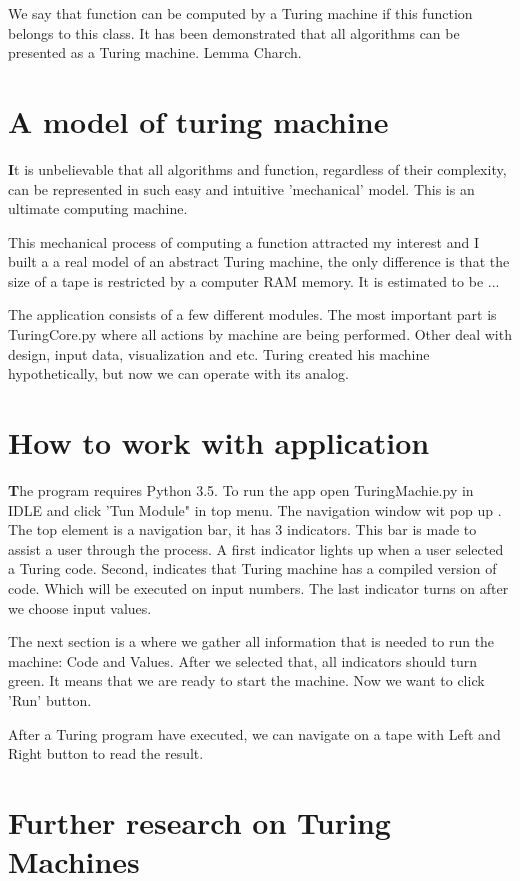\documentclass[12pt]{article}
\begin{document}
We say that function can be computed by a Turing machine if this function belongs to this class. It has been demonstrated that all algorithms can be presented as a Turing machine. Lemma Charch.

\section{A model of turing machine}
\textbf{\large I}t is unbelievable that all algorithms and function, regardless of their complexity, can be represented in such easy and intuitive 'mechanical' model. This is an ultimate computing machine.

This mechanical process of computing a function attracted my interest and I built a a real model of an abstract Turing machine, the only difference is that the size of a tape is restricted by a computer RAM memory. It is estimated to be ... 

The application consists of a few different modules. The most important part is TuringCore.py where all actions by machine are being performed. Other deal with design, input data, visualization and etc. Turing created his machine hypothetically, but now we can operate with its analog.

\section{How to work with application}
\textbf{\large T}he program requires Python 3.5. To run the app open TuringMachie.py in IDLE and click 'Tun Module" in top menu. The navigation window wit pop up . The top element is a navigation bar, it has 3 indicators. This bar is made to assist a user through the process. A first indicator lights up when a user selected a Turing code. Second, indicates that Turing machine has a compiled version of code. Which will be executed on input numbers. The last indicator turns on after we choose input values.

The next section is a where we gather all information that is needed to run the machine: Code and Values. After we selected that, all indicators should turn green. It means that we are ready to start the machine. Now we want to click 'Run' button.

After a Turing program have executed, we can navigate on a tape with Left and Right button to read the result.

\section{Further research on Turing Machines}
\end{document}
